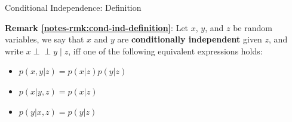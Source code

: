 \documentclass{beamer}
\newcommand{\indep}{\perp\!\!\!\perp}
\newcommand{\remark}[2]{\noindent\colorbox{red!10}{\parbox{0.995\textwidth}{\textbf{Remark \ref{notes-rmk:#1}}: #2}}\\}
\begin{document}
\begin{frame}{Conditional Independence: Definition}
\remark{cond-ind-definition}{
Let $x$, $y$, and $z$ be random variables, we say that $x$ and $y$ are \textbf{conditionally independent} given $z$, and write $x\indep y \;|\; z$, iff one of the following equivalent expressions holds:
\begin{itemize}
 \item $p(x,y|z) = p(x|z)p(y|z)$
 \item $p(x|y,z) = p(x|z)$
 \item $p(y|x,z) = p(y|z)$
\end{itemize}
}\vspace{3mm}
\end{frame}
% 
\end{document}

